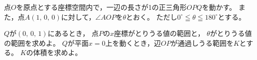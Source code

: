 \documentclass[../../main.tex]{subfiles}
\begin{document}
点$O$を原点とする座標空間内で，一辺の長さが1の正三角形$OPQ$を動かす。
また，点$A(1, \, 0, \, 0)$に対して，$\angle AOP$を$\theta$とおく。
ただし$0^\circ\leqq\theta\leqq{180}^\circ$とする。
\begin{enumerate}
  $Q$が$(0, \, 0, \, 1)$にあるとき，
    点$P$の$x$座標がとりうる値の範囲と，
    $\theta$がとりうる値の範囲を求めよ。
  $Q$が平面$x=0$上を動くとき，辺$OP$が通過しうる範囲を$K$とする。
    $K$の体積を求めよ。
\end{enumerate}
\end{document}
